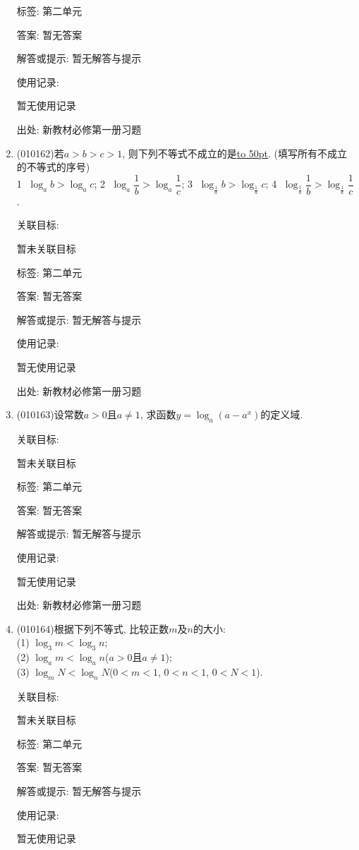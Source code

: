 \documentclass[10pt,a4paper]{article}
\newcommand{\blank}[1]{\underline{\hbox to #1pt{}}}
\begin{document}
\begin{enumerate}[1.]
标签: 第二单元

答案: 暂无答案

解答或提示: 暂无解答与提示

使用记录:

暂无使用记录


出处: 新教材必修第一册习题
\item { (010162)}若$a>b>c>1$, 则下列不等式不成立的是\blank{50}. (填写所有不成立的不等式的序号)\\
\textcircled{1} $\log_ab>\log_ac$; \textcircled{2} $\log_a\dfrac 1b>\log_a\dfrac 1c$; \textcircled{3} $\log_{\frac 1a}b>\log_{\frac 1a}c$; \textcircled{4} $\log_{\frac 1a}\dfrac 1b>\log_{\frac 1a}\dfrac 1c$.


关联目标:

暂未关联目标



标签: 第二单元

答案: 暂无答案

解答或提示: 暂无解答与提示

使用记录:

暂无使用记录


出处: 新教材必修第一册习题
\item { (010163)}设常数$a>0$且$a\ne 1$, 求函数$y=\log_a(a-a^x)$的定义域.


关联目标:

暂未关联目标



标签: 第二单元

答案: 暂无答案

解答或提示: 暂无解答与提示

使用记录:

暂无使用记录


出处: 新教材必修第一册习题
\item { (010164)}根据下列不等式, 比较正数$m$及$n$的大小:\\
(1) $\log_3m<\log_3n$;\\
(2) $\log_am<\log_an$($a>0$且$a\ne 1$);\\
(3) $\log_mN<\log_nN$($0<m<1$, $0<n<1$, $0<N<1$).


关联目标:

暂未关联目标



标签: 第二单元

答案: 暂无答案

解答或提示: 暂无解答与提示

使用记录:

暂无使用记录



\end{enumerate}
\end{document}
